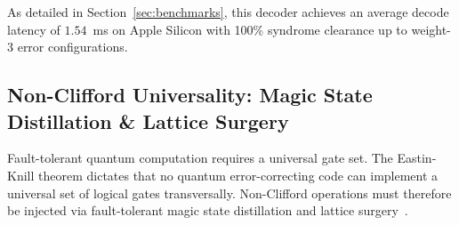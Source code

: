 \documentclass[aps,prx,twocolumn,superscriptaddress,nofootinbib]{revtex4-2}
\begin{document}
As detailed in Section~\ref{sec:benchmarks}, this decoder achieves an average decode latency of $1.54$~ms on Apple Silicon with 100\% syndrome clearance up to weight-3 error configurations.

\subsection{Non-Clifford Universality: Magic State Distillation \& Lattice Surgery}
\label{subsec:magic_distillation}

Fault-tolerant quantum computation requires a universal gate set. The Eastin-Knill theorem dictates that no quantum error-correcting code can implement a universal set of logical gates transversally. Non-Clifford operations must therefore be injected via fault-tolerant magic state distillation and lattice surgery~\cite{bravyi2005universal,horsman2012surface}.
\end{document}
